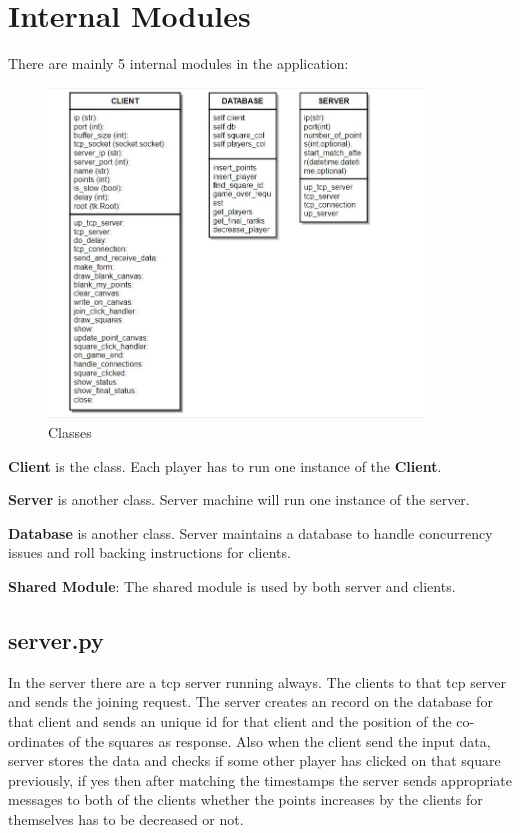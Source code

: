 \documentclass[manuscript,screen,review,nonacm]{acmart}
\begin{document}
\newpage
\section{Internal Modules}
There are mainly 5 internal modules in the application:
\begin{figure}[htp]
    \centering
    \includegraphics[width=10cm]{class-diagrams.jpeg}
    \caption{Classes}
\end{figure}

\textbf{Client} is the class. Each player has to run one instance of the \textbf{Client}.

\textbf{Server} is another class. Server machine will run one instance of the server.

\textbf{Database} is another class. Server maintains a database to handle concurrency issues and roll backing instructions for clients.

\textbf{Shared Module}: The shared module is used by both server and clients.

\subsection{server.py}
In the server there are a tcp server running always. The clients to that tcp server and sends the joining request. The server creates an record on the database for that client and sends an unique id for that client and the position of the co-ordinates of the squares as response. Also when the client send the input data, server stores the data and checks if some other player has clicked on that square previously, if yes then after matching the timestamps the server sends appropriate messages to both of the clients whether the points increases by the clients for themselves has to be decreased or not.
\end{document}
